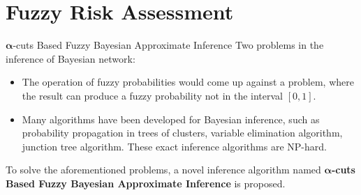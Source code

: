 \section{Fuzzy Risk Assessment}
\begin{frame}{$\bm{\alpha}$-cuts Based Fuzzy Bayesian Approximate Inference}
    Two problems in the inference of Bayesian network:\pause
    \begin{itemize}
      \item The operation of fuzzy probabilities would come up against a problem, where the result can produce a fuzzy probability not in the interval $[0,1]$.\pause
      \item Many algorithms have been developed for Bayesian inference, such as probability propagation in trees of clusters, variable elimination algorithm, junction tree algorithm. These exact inference algorithms are NP-hard.
    \end{itemize}

    \pause
    To solve the aforementioned problems, a novel inference algorithm named \textbf{$\bm{\alpha}$-cuts Based Fuzzy Bayesian Approximate Inference} is proposed.
\end{frame}

